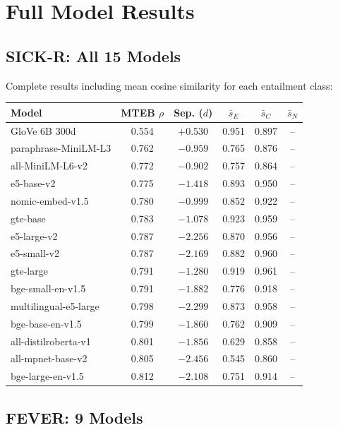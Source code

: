\documentclass{article}
\begin{document}
\section{Full Model Results}
\label{app:full_results}

\subsection{SICK-R: All 15 Models}

Complete results including mean cosine similarity for each entailment class:

\begin{center}
\small
\begin{tabular}{@{}lccccc@{}}
\toprule
\textbf{Model} & \textbf{MTEB $\rho$} & \textbf{Sep. ($d$)} & $\bar{s}_E$ & $\bar{s}_C$ & $\bar{s}_N$ \\
\midrule
GloVe 6B 300d & 0.554 & +0.530 & 0.951 & 0.897 & -- \\
paraphrase-MiniLM-L3 & 0.762 & $-0.959$ & 0.765 & 0.876 & -- \\
all-MiniLM-L6-v2 & 0.772 & $-0.902$ & 0.757 & 0.864 & -- \\
e5-base-v2 & 0.775 & $-1.418$ & 0.893 & 0.950 & -- \\
nomic-embed-v1.5 & 0.780 & $-0.999$ & 0.852 & 0.922 & -- \\
gte-base & 0.783 & $-1.078$ & 0.923 & 0.959 & -- \\
e5-large-v2 & 0.787 & $-2.256$ & 0.870 & 0.956 & -- \\
e5-small-v2 & 0.787 & $-2.169$ & 0.882 & 0.960 & -- \\
gte-large & 0.791 & $-1.280$ & 0.919 & 0.961 & -- \\
bge-small-en-v1.5 & 0.791 & $-1.882$ & 0.776 & 0.918 & -- \\
multilingual-e5-large & 0.798 & $-2.299$ & 0.873 & 0.958 & -- \\
bge-base-en-v1.5 & 0.799 & $-1.860$ & 0.762 & 0.909 & -- \\
all-distilroberta-v1 & 0.801 & $-1.856$ & 0.629 & 0.858 & -- \\
all-mpnet-base-v2 & 0.805 & $-2.456$ & 0.545 & 0.860 & -- \\
bge-large-en-v1.5 & 0.812 & $-2.108$ & 0.751 & 0.914 & -- \\
\bottomrule
\end{tabular}
\end{center}

\subsection{FEVER: 9 Models}
\end{document}
